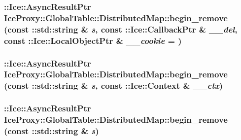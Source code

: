 \label{class_ice_proxy_1_1_global_table_1_1_distributed_map_a479d4d5d16d3d2f83c24a848cb5757f2}
\hypertarget{class_ice_proxy_1_1_global_table_1_1_distributed_map_a02216812ca9a3cbfd3b21f93c70475b6}{
\subsubsection[{begin\_\-remove}]{\setlength{\rightskip}{0pt plus 5cm}::Ice::AsyncResultPtr IceProxy::GlobalTable::DistributedMap::begin\_\-remove (const ::std::string \& {\em s}, \/  const ::Ice::CallbackPtr \& {\em \_\-\_\-del}, \/  const ::Ice::LocalObjectPtr \& {\em \_\-\_\-cookie} = {})}}
\label{class_ice_proxy_1_1_global_table_1_1_distributed_map_a02216812ca9a3cbfd3b21f93c70475b6}
\hypertarget{class_ice_proxy_1_1_global_table_1_1_distributed_map_ab4e20e4daba455d1ce906c7902a36920}{
\subsubsection[{begin\_\-remove}]{\setlength{\rightskip}{0pt plus 5cm}::Ice::AsyncResultPtr IceProxy::GlobalTable::DistributedMap::begin\_\-remove (const ::std::string \& {\em s}, \/  const ::Ice::Context \& {\em \_\-\_\-ctx})}}
\label{class_ice_proxy_1_1_global_table_1_1_distributed_map_ab4e20e4daba455d1ce906c7902a36920}
\hypertarget{class_ice_proxy_1_1_global_table_1_1_distributed_map_ae2df6dc016871497c81bd0949a3ea037}{
\subsubsection[{begin\_\-remove}]{\setlength{\rightskip}{0pt plus 5cm}::Ice::AsyncResultPtr IceProxy::GlobalTable::DistributedMap::begin\_\-remove (const ::std::string \& {\em s})}}
